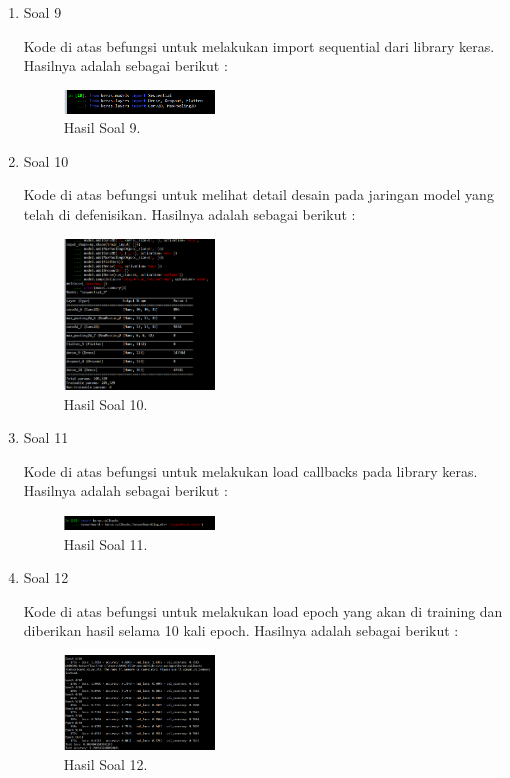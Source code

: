 \begin{enumerate}
	\item Soal 9
	\hfill\break
	
	Kode di atas befungsi untuk melakukan import sequential dari library keras. Hasilnya adalah sebagai berikut : 
	\begin{figure}[H]
	\centering
		\includegraphics[width=4cm]{figures/1174070/7/materi/hasil9.PNG}
		\caption{Hasil Soal 9.}
	\end{figure}

	\item Soal 10
	\hfill\break
	
	Kode di atas befungsi untuk melihat detail desain pada jaringan model yang telah di defenisikan. Hasilnya adalah sebagai berikut : 
	\begin{figure}[H]
	\centering
		\includegraphics[width=4cm]{figures/1174070/7/materi/hasil10.PNG}
		\caption{Hasil Soal 10.}
	\end{figure}

	\item Soal 11
	\hfill\break
	
	Kode di atas befungsi untuk melakukan load callbacks pada library keras. Hasilnya adalah sebagai berikut : 
	\begin{figure}[H]
	\centering
		\includegraphics[width=4cm]{figures/1174070/7/materi/hasil11.PNG}
		\caption{Hasil Soal 11.}
	\end{figure}

	\item Soal 12
	\hfill\break
	
	Kode di atas befungsi untuk melakukan load epoch yang akan di training dan diberikan hasil selama 10 kali epoch. Hasilnya adalah sebagai berikut :  
	\begin{figure}[H]
	\centering
		\includegraphics[width=4cm]{figures/1174070/7/materi/hasil12.PNG}
		\caption{Hasil Soal 12.}
	\end{figure}


\end{enumerate}
